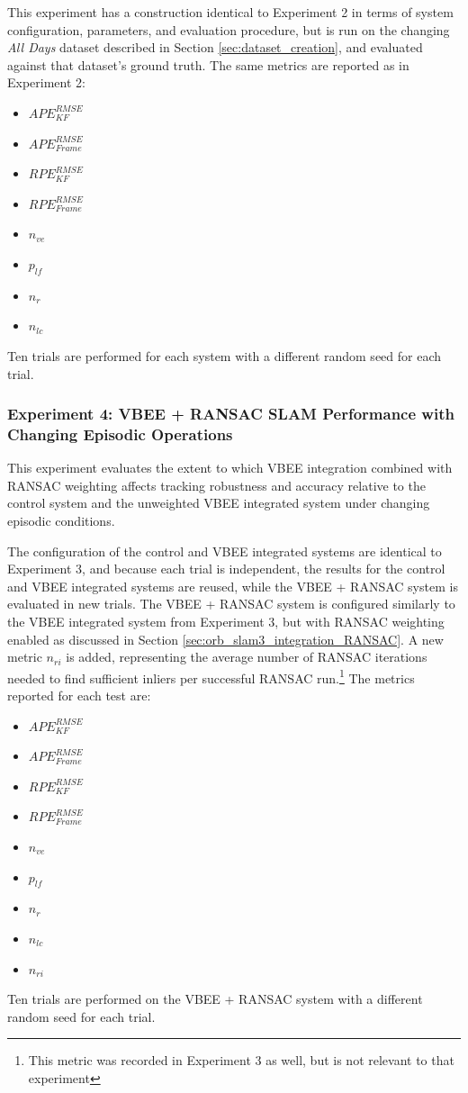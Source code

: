 This experiment has a construction identical to Experiment 2 in terms of system configuration, parameters, and evaluation procedure, but is run on the changing \textit{All Days} dataset described in Section \ref{sec:dataset_creation}, and evaluated against that dataset's ground truth. The same metrics are reported as in Experiment 2:
\begin{itemize}
    \item $APE^{RMSE}_{KF}$
    \item $APE^{RMSE}_{Frame}$
    \item $RPE^{RMSE}_{KF}$
    \item $RPE^{RMSE}_{Frame}$
    \item $n_{ve}$
    \item $p_{lf}$
    \item $n_{r}$
    \item $n_{lc}$
\end{itemize}

Ten trials are performed for each system with a different random seed for each trial.

\subsubsection*{Experiment 4: VBEE + RANSAC SLAM Performance with Changing Episodic Operations}
This experiment evaluates the extent to which VBEE integration combined with RANSAC weighting affects tracking robustness and accuracy relative to the control system and the unweighted VBEE integrated system under changing episodic conditions.

The configuration of the control and VBEE integrated systems are identical to Experiment 3, and because each trial is independent, the results for the control and VBEE integrated systems are reused, while the VBEE + RANSAC system is evaluated in new trials. The VBEE + RANSAC system is configured similarly to the VBEE integrated system from Experiment 3, but with RANSAC weighting enabled as discussed in Section \ref{sec:orb_slam3_integration_RANSAC}. A new metric $n_{ri}$ is added, representing the average number of RANSAC iterations needed to find sufficient inliers per successful RANSAC run.\footnote{This metric was recorded in Experiment 3 as well, but is not relevant to that experiment} The metrics reported for each test are:
 \begin{itemize}
    \item $APE^{RMSE}_{KF}$
    \item $APE^{RMSE}_{Frame}$
    \item $RPE^{RMSE}_{KF}$
    \item $RPE^{RMSE}_{Frame}$
    \item $n_{ve}$
    \item $p_{lf}$
    \item $n_{r}$
    \item $n_{lc}$
    \item $n_{ri}$
\end{itemize}

Ten trials are performed on the VBEE + RANSAC system with a different random seed for each trial.